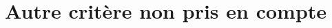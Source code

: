 \documentclass[../report]{subfiles}
\begin{document}
  \section{Autre critère non pris en compte}
%
%
%
%
%
%
%
%
%
%
\end{document}
